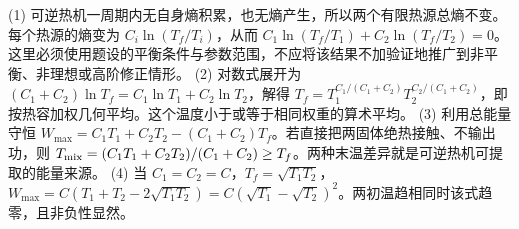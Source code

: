 (1) 可逆热机一周期内无自身熵积累，也无熵产生，所以两个有限热源总熵不变。每个热源的熵变为 \(C_i\ln(T_f/T_i)\)，从而 \(C_1\ln(T_f/T_1)+C_2\ln(T_f/T_2)=0\)。 这里必须使用题设的平衡条件与参数范围，不应将该结果不加验证地推广到非平衡、非理想或高阶修正情形。
(2) 对数式展开为 \((C_1+C_2)\ln T_f=C_1\ln T_1+C_2\ln T_2\)，解得 \(T_f=T_1^{C_1/(C_1+C_2)}T_2^{C_2/(C_1+C_2)}\)，即按热容加权几何平均。这个温度小于或等于相同权重的算术平均。
(3) 利用总能量守恒 \(W_{\max}=C_1T_1+C_2T_2-(C_1+C_2)T_f\)。若直接把两固体绝热接触、不输出功，则 \(T_{\rm mix}=(C_1T_1+C_2T_2)/(C_1+C_2)\ge T_f\)。两种末温差异就是可逆热机可提取的能量来源。
(4) 当 \(C_1=C_2=C\)，\(T_f=\sqrt{T_1T_2}\)，\(W_{\max}=C(T_1+T_2-2\sqrt{T_1T_2})=C(\sqrt{T_1}-\sqrt{T_2})^2\)。两初温趋相同时该式趋零，且非负性显然。
